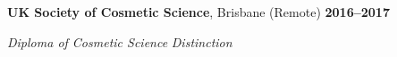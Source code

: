 \textbf{UK Society of Cosmetic Science}, Brisbane (Remote) \hfill \textbf{2016--2017} \par
\textit{Diploma of Cosmetic Science} \hfill \textit{Distinction}\par